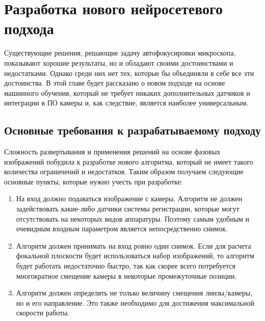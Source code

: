 \chapter{Разработка нового нейросетевого подхода} \label{ch2}
	

Существующие решения, решающие задачу автофокусировки микроскопа, показывают хорошие результаты, но и обладают своими достоинствами и недостатками. Однако среди них нет тех, которые бы объединяли в себе все эти достоинства. В этой главе будет рассказано о новом подходе на основе машинного обучения, который не требует никаких дополнительных датчиков и интеграции в ПО камеры и, как следствие, является наиболее универсальным.

\section{Основные требования к разрабатываемому подходу} \label{ch2:title-abbr} %

Сложность развертывания и применения решений на основе фазовых изображений побудила к разработке нового алгоритма, который не имеет такого количества ограничений и недостатков. Таким образом получаем следующие основные пункты, которые нужно учесть при разработке:

\begin{enumerate}[1.]
	\item На вход должно подаваться изображение с камеры. Алгоритм не должен задействовать какие-либо датчики системы регистрации, которые могут отсутствовать на некоторых видов аппаратуры. Поэтому самым удобным и очевидным входным параметром является непосредственно снимок.
	\item Алгоритм должен принимать на вход ровно один снимок. Если для расчета фокальной плоскости будет использоваться набор изображений, то алгоритм будет работать недостаточно быстро, так как скорее всего потребуется многократное смещение камеры в некоторые промежуточные позиции.
	\item Алгоритм должен определять не только величину смещения линзы/камеры, но и его направление. Это также необходимо для достижения максимальной скорости работы.
\end{enumerate}

